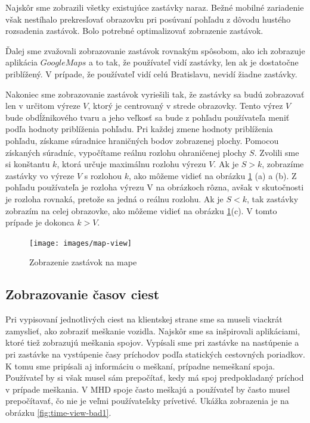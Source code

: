 Najskôr sme zobrazili všetky existujúce zastávky naraz. Bežné mobilné zariadenie však nestíhalo prekresľovať obrazovku pri posúvaní pohľadu z dôvodu hustého rozsadenia zastávok. Bolo potrebné optimalizovať zobrazenie zastávok. 

Ďalej sme zvažovali zobrazovanie zastávok rovnakým spôsobom, ako ich zobrazuje aplikácia $Google Maps$ a to tak, že používateľ vidí zastávky, len ak je dostatočne priblížený. V prípade, že používateľ vidí celú Bratislavu, nevidí žiadne zastávky. 

Nakoniec sme zobrazovanie zastávok vyriešili tak, že zastávky sa budú zobrazovať len v určitom výreze $V$, ktorý je centrovaný v strede obrazovky. Tento výrez $V$ bude obdĺžnikového tvaru a jeho veľkosť sa bude z pohľadu používateľa meniť podľa hodnoty priblíženia pohľadu. 
Pri každej zmene hodnoty priblíženia pohľadu, získame súradnice hraničných bodov zobrazenej plochy. Pomocou získaných súradníc, vypočítame reálnu rozlohu ohraničenej plochy $S$. Zvolili sme si konštantu $k$, ktorá určuje maximálnu rozlohu výrezu $V$. 
Ak je $S > k$, zobrazíme zastávky vo výreze $V$ s rozlohou $k$, ako môžeme vidieť na obrázku \ref{fig:map-view} (a) a (b). Z pohľadu používateľa je rozloha výrezu V na obrázkoch rôzna, avšak v skutočnosti je rozloha rovnaká, pretože sa jedná o reálnu rozlohu.
Ak je $S < k$, tak zastávky zobrazím na celej obrazovke, ako môžeme vidieť na obrázku \ref{fig:map-view}(c). V tomto prípade je dokonca $k > V$.

\begin{figure}[H]
\centerline{\texttt{[image: images/map-view]}}
\caption[Zobrazenie zastávok na mape]{Zobrazenie zastávok na mape}
\label{fig:map-view}
\end{figure}

\subsection{Zobrazovanie časov ciest}
Pri vypisovaní jednotlivých ciest na klientskej strane sme sa museli viackrát zamyslieť, ako zobraziť meškanie vozidla. Najskôr sme sa inšpirovali aplikáciami, ktoré tiež zobrazujú meškania spojov. Vypísali sme pri zastávke na nastúpenie a pri zastávke na vystúpenie časy príchodov podľa statických cestovných poriadkov. K tomu sme pripísali aj informáciu o meškaní, prípadne nemeškaní spoja. Používateľ by si však musel sám prepočítať, kedy má spoj predpokladaný príchod v prípade meškania. V MHD spoje často meškajú a používateľ by často musel prepočítavať, čo nie je veľmi používateľsky prívetivé. Ukážka zobrazenia je na obrázku \ref{fig:time-view-bad1}.

